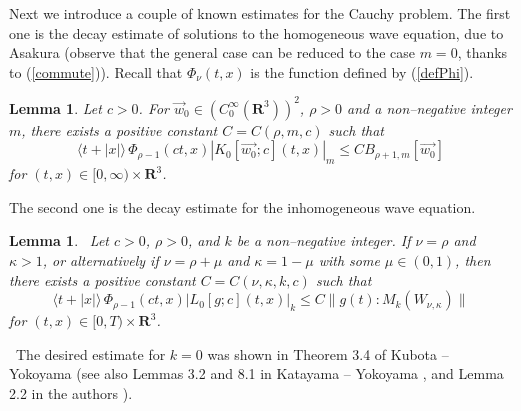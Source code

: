 \documentclass[12pt]{amsart}
\newcommand{\R}{{\mathbf R}}
\newtheorem{lemma}[theorem]{Lemma}
\numberwithin{equation}{section}
\begin{document}
\vspace{2mm}

Next
we 
introduce
a couple of known estimates for
the Cauchy problem. The first one is the decay estimate of
solutions to the homogeneous wave equation, due to Asakura \cite[Proposition 1.1]{asa} 
(observe that the general case can be reduced to the case $m=0$, thanks to (\ref{commute})).
Recall that ${\Phi}_\nu(t,x)$ is the function defined by (\ref{defPhi}).

\begin{lemma}\label{lem:freeH}
Let $c>0$.
For $\vec{w}_0\in (C_0^\infty(\R^3))^2$,
$\rho>0$ and a non--negative integer $m$, there exists a positive constant $C=C(\rho, m, c)$ such that
\begin{equation}\label{decay}
\langle t+|x| \rangle\,{\Phi}_{\rho-1}(ct,x)
   |K_{0}[\vec{w_0}; c](t,x)|_m \le C B_{\rho+1, m}[\vec{w_0}]
\end{equation}
for $(t,x) \in [0,\infty) \times \R^3$.
\end{lemma}


\vspace{2mm}

The second one is the decay estimate for the inhomogeneous wave equation.

\begin{lemma}\label{free}\
Let $c>0$, $\rho>0$, %
and $k$ be a non--negative integer. 
If $\nu=\rho$ and $\kappa>1$, or alternatively if $\nu=\rho+\mu$ and $\kappa=1-\mu$
with some $\mu\in (0,1)$,
then there exists a positive constant $C=C(\nu, \kappa, k, c)$ such that
\begin{equation}\label{ba1}
\langle t+|x| \rangle\,{\Phi}_{\rho-1}(ct,x) |L_{0}[g; c](t,x)|_k
 \le C \|g(t)\!:\!{M_k(W_{\nu,\kappa})}\|
\end{equation}
for $(t,x) \in [0,T) \times \R^3$.
\end{lemma}

\ 
The desired estimate for $k=0$ 
was shown in Theorem 3.4 of Kubota -- Yokoyama \cite{Kub-Yok01}
(see also Lemmas 3.2 and 8.1 in Katayama -- Yokoyama \cite{kayo},
 and Lemma 2.2 in the authors \cite{KaKu07}).
\end{document}
